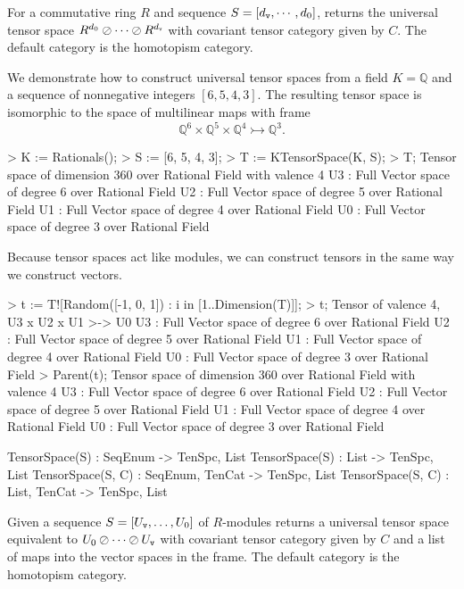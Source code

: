 For a commutative ring $R$ and sequence $S=[d_{\operatorname{\mathtt{v}}},\cdots, d_0]$, returns the
universal tensor space $R^{d_0}\oslash\cdots\oslash R^{d_{\operatorname{\mathtt{v}}}}$ with covariant tensor
category given by $C$. The default category is the homotopism category.

\begin{example}[UniversalKTenSpc]

We demonstrate how to construct universal tensor spaces from a field
$K=\mathbb{Q}$ and a sequence of nonnegative integers $[6,5,4,3]$. The resulting
tensor space is isomorphic to the space of multilinear maps with frame 
\[ 
    \mathbb{Q}^6\times \mathbb{Q}^5\times\mathbb{Q}^4\rightarrowtail\mathbb{Q}^3.
\]
\begin{code}
> K := Rationals();
> S := [6, 5, 4, 3];
> T := KTensorSpace(K, S);
> T;
Tensor space of dimension 360 over Rational Field with valence 4
U3 : Full Vector space of degree 6 over Rational Field
U2 : Full Vector space of degree 5 over Rational Field
U1 : Full Vector space of degree 4 over Rational Field
U0 : Full Vector space of degree 3 over Rational Field
\end{code}

Because tensor spaces act like modules, we can construct tensors in the same way we construct vectors.
\begin{code}
> t := T![Random([-1, 0, 1]) : i in [1..Dimension(T)]];
> t;
Tensor of valence 4, U3 x U2 x U1 >-> U0
U3 : Full Vector space of degree 6 over Rational Field
U2 : Full Vector space of degree 5 over Rational Field
U1 : Full Vector space of degree 4 over Rational Field
U0 : Full Vector space of degree 3 over Rational Field
> Parent(t);
Tensor space of dimension 360 over Rational Field with valence 4
U3 : Full Vector space of degree 6 over Rational Field
U2 : Full Vector space of degree 5 over Rational Field
U1 : Full Vector space of degree 4 over Rational Field
U0 : Full Vector space of degree 3 over Rational Field
\end{code}
\end{example}


\begin{intrinsics}
TensorSpace(S) : SeqEnum -> TenSpc, List
TensorSpace(S) : List -> TenSpc, List
TensorSpace(S, C) : SeqEnum, TenCat -> TenSpc, List
TensorSpace(S, C) : List, TenCat -> TenSpc, List
\end{intrinsics}

Given a sequence $S=[U_{\operatorname{\mathtt{v}}},\dots, U_0]$ of $R$-modules returns a universal tensor 
space equivalent to $U_0\oslash \cdots\oslash U_{\operatorname{\mathtt{v}}}$ with covariant tensor 
category given by $C$ and a list of maps into the vector spaces in the frame. 
The default category is the homotopism category. 

